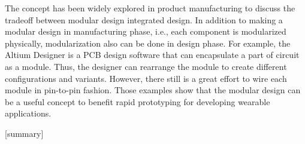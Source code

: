 The concept has been widely explored in product manufacturing to discuss the tradeoff between modular design integrated design\cite{schilling2000toward, ulrich1995role}. 
In addition to making a modular design in manufacturing phase, i.e., each component is modularized physically, modularization also can be done in design phase. For example, the Altium Designer \cite{AltiumDesigner} is a PCB design software that can encapsulate a part of circuit as a module. Thus, the designer can rearrange the module to create different configurations and variants. However, there still is a great effort to wire each module in pin-to-pin fashion.
Those examples show that the modular design can be a useful concept to benefit rapid prototyping for developing wearable applications.

[summary]


